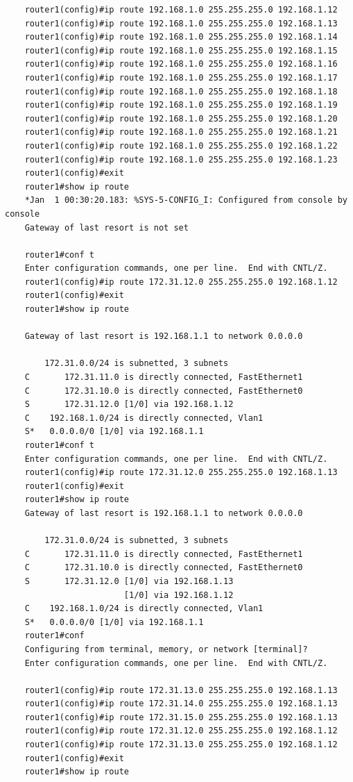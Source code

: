 \documentclass{jlreq}
\begin{document}
    \begin{lstlisting}
    router1(config)#ip route 192.168.1.0 255.255.255.0 192.168.1.12
    router1(config)#ip route 192.168.1.0 255.255.255.0 192.168.1.13
    router1(config)#ip route 192.168.1.0 255.255.255.0 192.168.1.14
    router1(config)#ip route 192.168.1.0 255.255.255.0 192.168.1.15
    router1(config)#ip route 192.168.1.0 255.255.255.0 192.168.1.16
    router1(config)#ip route 192.168.1.0 255.255.255.0 192.168.1.17
    router1(config)#ip route 192.168.1.0 255.255.255.0 192.168.1.18
    router1(config)#ip route 192.168.1.0 255.255.255.0 192.168.1.19
    router1(config)#ip route 192.168.1.0 255.255.255.0 192.168.1.20
    router1(config)#ip route 192.168.1.0 255.255.255.0 192.168.1.21
    router1(config)#ip route 192.168.1.0 255.255.255.0 192.168.1.22
    router1(config)#ip route 192.168.1.0 255.255.255.0 192.168.1.23
    router1(config)#exit
    router1#show ip route
    *Jan  1 00:30:20.183: %SYS-5-CONFIG_I: Configured from console by console
    Gateway of last resort is not set

    router1#conf t
    Enter configuration commands, one per line.  End with CNTL/Z.
    router1(config)#ip route 172.31.12.0 255.255.255.0 192.168.1.12
    router1(config)#exit
    router1#show ip route

    Gateway of last resort is 192.168.1.1 to network 0.0.0.0

        172.31.0.0/24 is subnetted, 3 subnets
    C       172.31.11.0 is directly connected, FastEthernet1
    C       172.31.10.0 is directly connected, FastEthernet0
    S       172.31.12.0 [1/0] via 192.168.1.12
    C    192.168.1.0/24 is directly connected, Vlan1
    S*   0.0.0.0/0 [1/0] via 192.168.1.1
    router1#conf t
    Enter configuration commands, one per line.  End with CNTL/Z.
    router1(config)#ip route 172.31.12.0 255.255.255.0 192.168.1.13
    router1(config)#exit
    router1#show ip route
    Gateway of last resort is 192.168.1.1 to network 0.0.0.0

        172.31.0.0/24 is subnetted, 3 subnets
    C       172.31.11.0 is directly connected, FastEthernet1
    C       172.31.10.0 is directly connected, FastEthernet0
    S       172.31.12.0 [1/0] via 192.168.1.13
                        [1/0] via 192.168.1.12
    C    192.168.1.0/24 is directly connected, Vlan1
    S*   0.0.0.0/0 [1/0] via 192.168.1.1
    router1#conf
    Configuring from terminal, memory, or network [terminal]?
    Enter configuration commands, one per line.  End with CNTL/Z.

    router1(config)#ip route 172.31.13.0 255.255.255.0 192.168.1.13
    router1(config)#ip route 172.31.14.0 255.255.255.0 192.168.1.13
    router1(config)#ip route 172.31.15.0 255.255.255.0 192.168.1.13
    router1(config)#ip route 172.31.12.0 255.255.255.0 192.168.1.12
    router1(config)#ip route 172.31.13.0 255.255.255.0 192.168.1.12
    router1(config)#exit
    router1#show ip route


\end{lstlisting}
\end{document}
